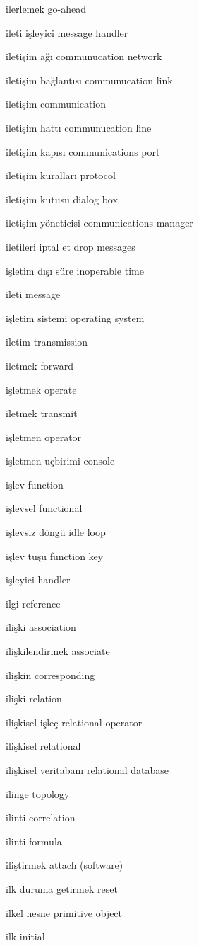\documentclass[12pt,fleqn]{article}\usepackage{../../common}
\begin{document}
ilerlemek go-ahead

ileti işleyici message handler

iletişim ağı communucation network

iletişim bağlantısı communucation link

iletişim communication

iletişim hattı communucation line

iletişim kapısı communications port

iletişim kuralları protocol

iletişim kutusu dialog box

iletişim yöneticisi communications manager

iletileri iptal et drop messages

işletim dışı süre inoperable time

ileti message

işletim sistemi operating system

iletim transmission

iletmek forward

işletmek operate

iletmek transmit

işletmen operator

işletmen uçbirimi console

işlev function

işlevsel functional

işlevsiz döngü idle loop

işlev tuşu function key

işleyici handler

ilgi reference

ilişki association

ilişkilendirmek associate

ilişkin corresponding

ilişki relation

ilişkisel işleç relational operator

ilişkisel relational

ilişkisel veritabanı relational database

ilinge topology

ilinti correlation

ilinti formula

iliştirmek attach (software)

ilk duruma getirmek reset

ilkel nesne primitive object

ilk initial
\end{document}

